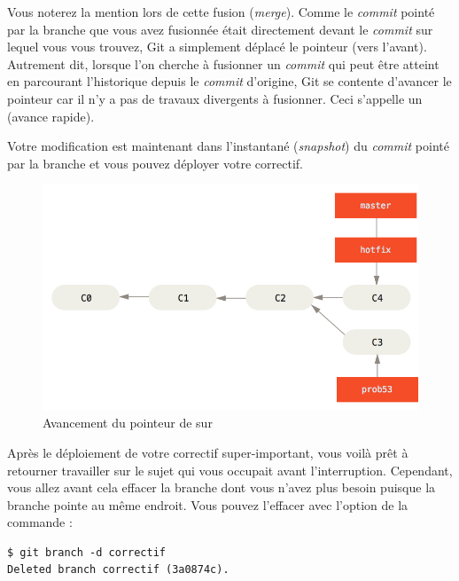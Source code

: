 Vous noterez la mention  lors de cette fusion (\emph{merge}).
Comme le \emph{commit}  pointé par la branche  que vous avez fusionnée était directement devant le \emph{commit}  sur lequel vous vous trouvez, Git a simplement déplacé le pointeur (vers l'avant).
Autrement dit, lorsque l'on cherche à fusionner un \emph{commit} qui peut être atteint en parcourant l'historique depuis le \emph{commit} d'origine, Git se contente d'avancer le pointeur car il n'y a pas de travaux divergents à fusionner. Ceci s'appelle un  (avance rapide).

Votre modification est maintenant dans l'instantané (\emph{snapshot}) du \emph{commit} pointé par la branche  et vous pouvez déployer votre correctif.

\begin{figure}[H]
  \centering
  \includegraphics{images/basic-branching-5}
  \caption{Avancement du pointeur de  sur }
  \label{fig:git:basic-branching-5}
\end{figure}

Après le déploiement de votre correctif super-important, vous voilà prêt à retourner travailler sur le sujet qui vous occupait avant l'interruption.
Cependant, vous allez avant cela effacer la branche  dont vous n'avez plus besoin puisque la branche  pointe au même endroit.
Vous pouvez l'effacer avec l'option  de la commande :

\begin{Schunk}
\begin{Verbatim}
$ git branch -d correctif
Deleted branch correctif (3a0874c).
\end{Verbatim}
\end{Schunk}

